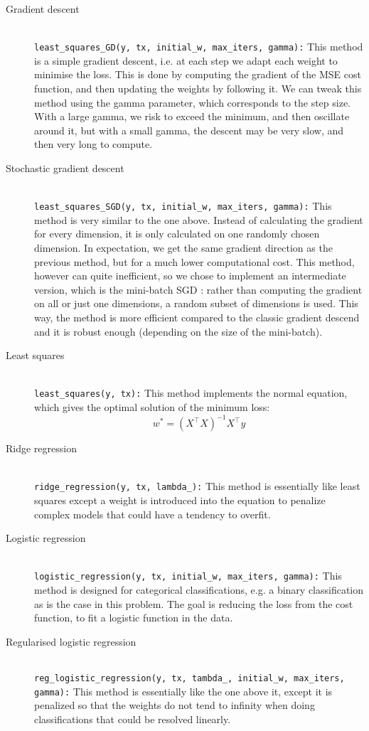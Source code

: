 \documentclass[10pt,conference,compsocconf]{IEEEtran}
\newcommand{\code}[1]{\texttt{#1}} %
\begin{document}
\begin{description}

\item[Gradient descent] \ \\
\code{least\_squares\_GD(y, tx, initial\_w, max\_iters, gamma):} This method is a simple gradient descent, i.e. at each step we adapt each weight to minimise the loss. This is done by computing the gradient of the MSE cost function, and then updating the weights by following it. We can tweak this method using the gamma parameter, which corresponds to the step size. With a large gamma, we risk to exceed the minimum, and then oscillate around it, but with a small gamma, the descent may be very slow, and then very long to compute.

\item[Stochastic gradient descent] \ \\
\code{least\_squares\_SGD(y, tx, initial\_w, max\_iters, gamma):} This method is very similar to the one above. Instead of calculating the gradient for every dimension, it is only calculated on one randomly chosen dimension. In expectation, we get the same gradient direction as the previous method, but for a much lower computational cost. This method, however can quite inefficient, so we chose to implement an intermediate version, which is the mini-batch SGD : rather than computing the gradient on all or just one dimensions, a random subset of dimensions is used. This way, the method is more efficient compared to the classic gradient descend and it is robust enough (depending on the size of the mini-batch).

\item[Least squares] \ \\
\code{least\_squares(y, tx):} This method implements the normal equation, which gives the optimal solution of the minimum loss: $$w^* = (X^{\top}X)^{-1}X^{\top}y$$

\item[Ridge regression] \ \\
\code{ridge\_regression(y, tx, lambda\_):} This method is essentially like least squares except a weight is introduced into the equation to penalize complex models that could have a tendency to overfit.

\item[Logistic regression] \ \\
\code{logistic\_regression(y, tx, initial\_w, max\_iters, gamma):} This method is designed for categorical classifications, e.g. a binary classification as is the case in this problem. The goal is reducing the loss from the cost function, to fit a logistic function in the data.

\item[Regularised logistic regression] \ \\
\code{reg\_logistic\_regression(y, tx, tambda\_, initial\_w, max\_iters, gamma):} This method is essentially like the one above it, except it is penalized so that the weights do not tend to infinity when doing classifications that could be resolved linearly. 

\end{description}
\end{document}
